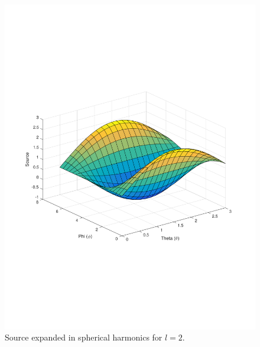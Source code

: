 \documentclass[10pt]{article}
\begin{document}
\begin{figure}[H]
  \centering
  \includegraphics[width=15cm]{l_2.pdf}
  \caption{Source expanded in spherical harmonics for \(l=2\).}
  \label{fig:two}
\end{figure}
\end{document}
